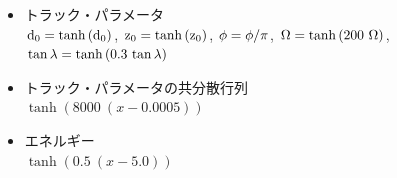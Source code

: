 \begin{itemize}
 \item トラック・パラメータ\\
 ${\rm d_0} = \tanh{({\rm d_0})}$,
 ${\rm z_0} = \tanh{({\rm z_0})}$,
 ${\rm \phi} = {\rm \phi}/\pi$,
 ${\rm \Omega} = \tanh{(200\ {\rm \Omega})}$,
 ${\rm \tan{\lambda}} = \tanh{(0.3\ {\rm \tan{\lambda}})}$
 \item トラック・パラメータの共分散行列\\
 $\tanh{(8000\ (x-0.0005))}$
 \item エネルギー\\
 $\tanh{(0.5\ (x-5.0))}$
\end{itemize}


